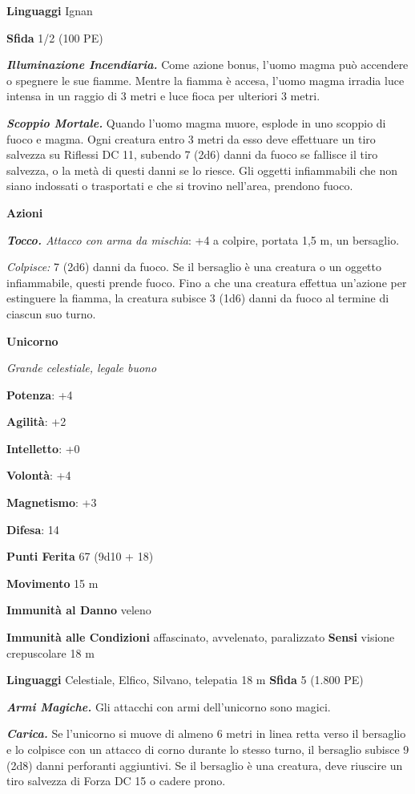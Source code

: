 \begin{multicols}{2}
\textbf{Linguaggi} Ignan

\textbf{Sfida} 1/2 (100 PE)

\emph{\textbf{Illuminazione Incendiaria.}} Come azione bonus, l'uomo
magma può accendere o spegnere le sue fiamme. Mentre la fiamma è accesa,
l'uomo magma irradia luce intensa in un raggio di 3 metri e luce fioca
per ulteriori 3 metri.

\emph{\textbf{Scoppio Mortale.}} Quando l'uomo magma muore, esplode in
uno scoppio di fuoco e magma. Ogni creatura entro 3 metri da esso deve
effettuare un tiro salvezza su Riflessi DC 11, subendo 7 (2d6) danni da
fuoco se fallisce il tiro salvezza, o la metà di questi danni se lo
riesce. Gli oggetti infiammabili che non siano indossati o trasportati e
che si trovino nell'area, prendono fuoco.

\textbf{Azioni}

\emph{\textbf{Tocco.} Attacco con arma da mischia}: +4 a colpire,
portata 1,5 m, un bersaglio.

\emph{Colpisce:} 7 (2d6) danni da fuoco. Se il bersaglio è una creatura
o un oggetto infiammabile, questi prende fuoco. Fino a che una creatura
effettua un'azione per estinguere la fiamma, la creatura subisce 3 (1d6)
danni da fuoco al termine di ciascun suo turno.

\textbf{Unicorno}

\emph{Grande celestiale, legale buono}

\textbf{Potenza}: +4

\textbf{Agilità}: +2

\textbf{Intelletto}: +0

\textbf{Volontà}: +4

\textbf{Magnetismo}: +3

\textbf{Difesa}: 14

\textbf{Punti Ferita} 67 (9d10 + 18)

\textbf{Movimento} 15 m

\textbf{Immunità al Danno} veleno

\textbf{Immunità alle Condizioni} affascinato, avvelenato, paralizzato
\textbf{Sensi} visione crepuscolare 18 m

\textbf{Linguaggi} Celestiale, Elfico, Silvano, telepatia 18 m
\textbf{Sfida} 5 (1.800 PE)

\emph{\textbf{Armi Magiche.}} Gli attacchi con armi dell'unicorno sono
magici.

\emph{\textbf{Carica.}} Se l'unicorno si muove di almeno 6 metri in
linea retta verso il bersaglio e lo colpisce con un attacco di corno
durante lo stesso turno, il bersaglio subisce 9 (2d8) danni perforanti
aggiuntivi. Se il bersaglio è una creatura, deve riuscire un tiro
salvezza di Forza DC 15 o cadere prono.


\end{multicols}
